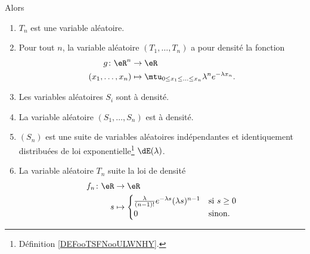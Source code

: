 \begin{theorem}
    Alors
    \begin{enumerate}
        \item       \label{ITEMooSLWOooRjYhBA}
            \( T_n\) est une variable aléatoire.    
        \item   \label{ITEMooHGXTooOdonXa}
            Pour tout \( n\), la variable aléatoire \( (T_1,\ldots, T_n)\) a pour densité la fonction
            \begin{equation}
                \begin{aligned}
                    g\colon \eR^n&\to \eR \\
                    (x_1,\ldots, x_n)&\mapsto \mtu_{0\leq x_1\leq \ldots\leq x_n}\lambda^n e^{-\lambda x_n}. 
                \end{aligned}
            \end{equation}
        \item       \label{ITEMooGBIXooSjXpsx}
            Les variables aléatoires \( S_i\) sont à densité.
        \item       \label{ITEMooUTTWooOUhkZh}
            La variable aléatoire \( (S_1,\ldots, S_n)\) est à densité.
        \item       \label{ITEMooUZGFooAbCvvG}
            \( (S_n)\) est une suite de variables aléatoires indépendantes et identiquement distribuées de loi exponentielle\footnote{Définition \ref{DEFooTSFNooULWNHY}.} \( \dE(\lambda)\).
        \item   \label{ITEMooDXZFooXkklhG}
            La variable aléatoire \( T_n\) suite la loi de densité
            \begin{equation}
                \begin{aligned}
                    f_n\colon \eR&\to \eR \\
                    s&\mapsto \begin{cases}
                        \frac{ \lambda }{ (n-1)! } e^{-\lambda s}(\lambda s)^{n-1}    &   \text{si } s\geq 0\\
                        0    &    \text{sinon. }
                    \end{cases}\\
                \end{aligned}
            \end{equation}
    \end{enumerate}
\end{theorem}

